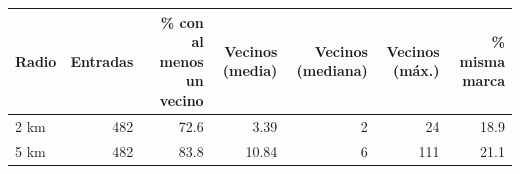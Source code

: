 \begin{tabular}{lrrrrrr}
\toprule
Radio & Entradas & \% con al menos un vecino & Vecinos (media) & Vecinos (mediana) & Vecinos (máx.) & \% misma marca \\
\midrule
2 km & 482 & 72.6 & 3.39 & 2 & 24 & 18.9 \\
5 km & 482 & 83.8 & 10.84 & 6 & 111 & 21.1 \\
\bottomrule
\end{tabular}
